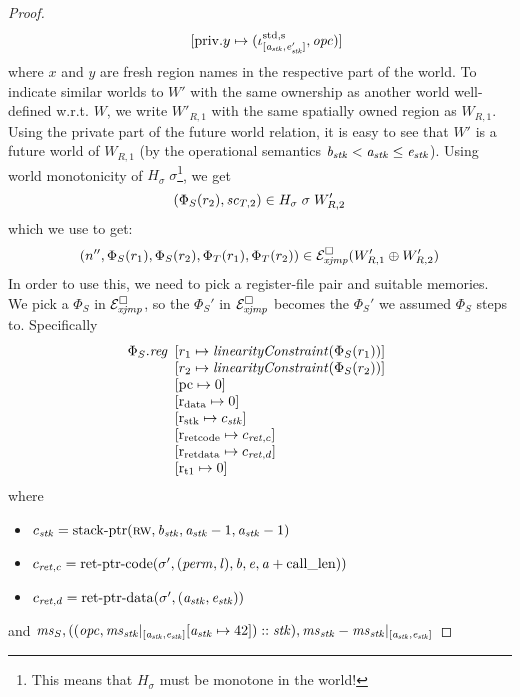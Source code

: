 \documentclass[a4paper]{article}
\begin{document}
\begin{proof}
\[\begin{array}{r l}
               & \update{\mathrm{priv}.y}{(\stdreg{[\aaddr_\stk,\eaddr_\stk']}{\spa},\opc)}
  \end{array}
\]
where $x$ and $y$ are fresh region names in the respective part of the world. To indicate similar worlds to $W'$ with the same ownership as another world well-defined w.r.t. $W$, we write $W'_{R,1}$ with the same spatially owned region as $W_{R,1}$. Using the private part of the future world relation, it is easy to see that $W'$ is a future world of $W_{R,1}$ (by the operational semantics $\baddr_\stk < \aaddr_\stk \leq \eaddr_\stk$). Using world monotonicity of $H_\sigma \; \sigma$\footnote{{\color{red}This means that $H_\sigma$ must be monotone in the world!}}, we get
\[
  (\Phi_S(r_2), \vsc_{T,2}) \in H_\sigma \; \sigma \; W'_{R,2}
\]
which we use to get:
\[
  \npair[n'']{\Phi_S(r_1),\Phi_S(r_2),\Phi_T(r_1),\Phi_T(r_2)} \in \lrexj(W_{R,1}' \oplus W_{R,2}')
\]
In order to use this, we need to pick a register-file pair and suitable memories. We pick a $\Phi_S$ in $\lrexj$, so the $\Phi_S'$ in $\lrexj$ becomes the $\Phi_S'$ we assumed $\Phi_S$ steps to. Specifically
\[
  \Phi_S.\reg
  \begin{array}[t]{l}
    \update{r_1}{\linCons{\Phi_S(r_1)}}\\
    \update{r_2}{\linCons{\Phi_S(r_2)}}\\
    \update{\pcreg}{0} \\
    \update{\rdata}{0} \\
    \update{\rstk}{c_\stk}\\
    \update{\rretc}{c_{\ret,c}}\\
    \update{\rretd}{c_{\ret,d}}\\
    \update{\rtmp{1}}{0}\\
  \end{array}
\]
where
\begin{itemize}
\item $c_\stk = \stkptr{\rw,\baddr_\stk,\aaddr_\stk-1,\aaddr_\stk-1}$
\item $c_{\ret,c} = \retptrc(\sigma',(\perm,\lin),\baddr,\eaddr,\aaddr+\calllen))$
\item $c_{\ret,d} = \retptrd(\sigma',(\aaddr_\stk,\eaddr_\stk))$
\end{itemize}
and
$\ms_S,((\opc,\ms_\stk|_{[\aaddr_\stk,\eaddr_\stk]}\update{\aaddr_\stk}{42}) :: \stk),\ms_\stk-\ms_\stk|_{[\aaddr_\stk,\eaddr_\stk]}$


\end{proof}
\end{document}
